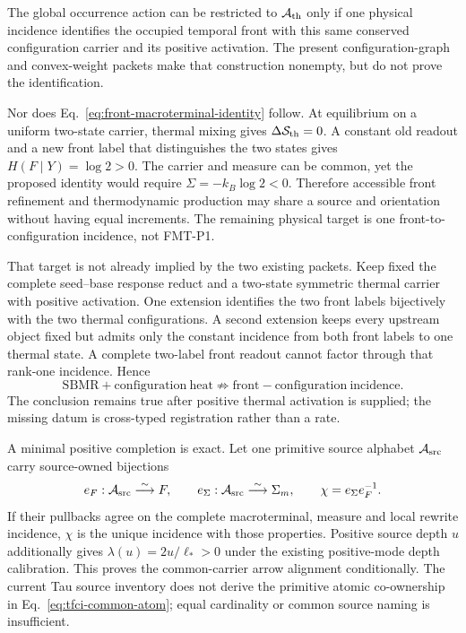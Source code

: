 \documentclass[11pt]{article}
\begin{document}
The global occurrence action can be restricted to
$\mathcal A_{\rm th}$ only if one physical incidence identifies the occupied
temporal front with this same conserved configuration carrier and its positive
activation.  The present configuration-graph and convex-weight packets make
that construction nonempty, but do not prove the identification.

Nor does Eq.~\eqref{eq:front-macroterminal-identity} follow.  At equilibrium
on a uniform two-state carrier, thermal mixing gives
$\Delta\mathcal S_{\rm th}=0$.  A constant old readout and a new front label
that distinguishes the two states gives $H(F\mid Y)=\log2>0$.  The carrier
and measure can be common, yet the proposed identity would require
$\Sigma=-k_B\log2<0$.  Therefore accessible front refinement and
thermodynamic production may share a source and orientation without having
equal increments.  The remaining physical target is one front-to-
configuration incidence, not FMT-P1.

That target is not already implied by the two existing packets.  Keep fixed
the complete seed--base response reduct and a two-state symmetric thermal
carrier with positive activation.  One extension identifies the two front
labels bijectively with the two thermal configurations.  A second extension
keeps every upstream object fixed but admits only the constant incidence from
both front labels to one thermal state.  A complete two-label front readout
cannot factor through that rank-one incidence.  Hence
\begin{equation}
 \boxed{
 \mathrm{SBMR+configuration\ heat}
 \not\Longrightarrow \mathrm{front\!\!-configuration\ incidence}.}
 \label{eq:tfci-non-entailment}
\end{equation}
The conclusion remains true after positive thermal activation is supplied;
the missing datum is cross-typed registration rather than a rate.

A minimal positive completion is exact.  Let one primitive source alphabet
$\mathcal A_{\rm src}$ carry source-owned bijections
\begin{equation}
 e_F:\mathcal A_{\rm src}\overset{\sim}{\longrightarrow}F,
 \qquad
 e_\Sigma:\mathcal A_{\rm src}\overset{\sim}{\longrightarrow}\Sigma_m,
 \qquad
 \chi=e_\Sigma e_F^{-1}.
 \label{eq:tfci-common-atom}
\end{equation}
If their pullbacks agree on the complete macroterminal, measure and local
rewrite incidence, $\chi$ is the unique incidence with those properties.
Positive source depth $u$ additionally gives
$\lambda(u)=2u/\ell_*>0$ under the existing positive-mode depth calibration.
This proves the common-carrier arrow alignment conditionally.  The current
Tau source inventory does not derive the primitive atomic co-ownership in
Eq.~\eqref{eq:tfci-common-atom}; equal cardinality or common source naming is
insufficient.
\end{document}
